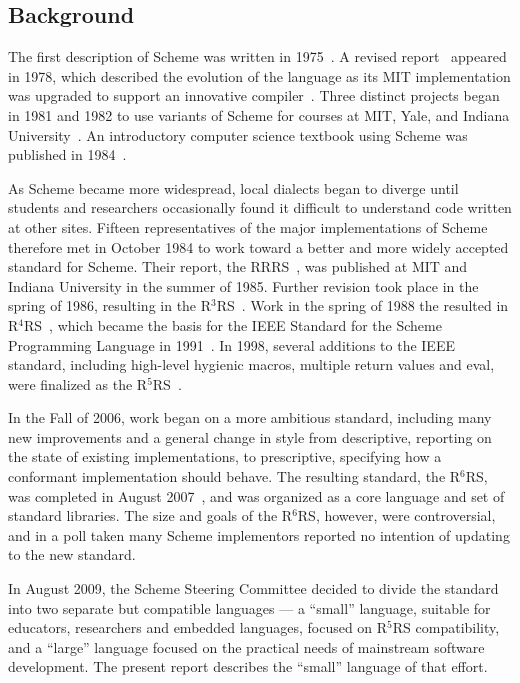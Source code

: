 \subsection*{Background}

\vest The first description of Scheme was written in
1975~\cite{Scheme75}.  A revised report~\cite{Scheme78}
appeared in 1978, which described the evolution
of the language as its MIT implementation was upgraded to support an
innovative compiler~\cite{Rabbit}.  Three distinct projects began in
1981 and 1982 to use variants of Scheme for courses at MIT, Yale, and
Indiana University~\cite{Rees82,MITScheme,Scheme311}.  An introductory
computer science textbook using Scheme was published in
1984~\cite{SICP}.

\vest As Scheme became more widespread,
local dialects began to diverge until students and researchers
occasionally found it difficult to understand code written at other
sites.
Fifteen representatives of the major implementations of Scheme therefore
met in October 1984 to work toward a better and more widely accepted
standard for Scheme.
Their report, the RRRS~\cite{RRRS},
was published at MIT and Indiana University in the summer of 1985.
Further revision took place in the spring of 1986, resulting in the
R$^{3}$RS~\cite{R3RS}.
Work in the spring of 1988 the resulted in R$^{4}$RS~\cite{R4RS},
which became the basis for the
IEEE Standard for the Scheme Programming Language in 1991~\cite{IEEEScheme}.
In 1998, several additions to the IEEE standard, including high-level
hygienic macros, multiple return values and {\cf eval}, were finalized
as the R$^{5}$RS~\cite{R5RS}.


In the Fall of 2006, work began on a more ambitious standard, including
many new improvements and a general change in style from descriptive,
reporting on the state of existing implementations, to prescriptive,
specifying how a conformant implementation should behave.  The
resulting standard, the R$^{6}$RS, was completed in August
2007~\cite{R6RS}, and was organized as a core language and set of
standard libraries.  The size and goals of the R$^{6}$RS, however,
were controversial, and in a poll taken many Scheme implementors
reported no intention of updating to the new standard.

In August 2009, the Scheme Steering Committee decided to divide the
standard into two separate but compatible languages --- a ``small''
language, suitable for educators, researchers and embedded languages,
focused on R$^{5}$RS compatibility, and a ``large'' language focused
on the practical needs of mainstream software development.
The present report describes the ``small'' language of that effort.



